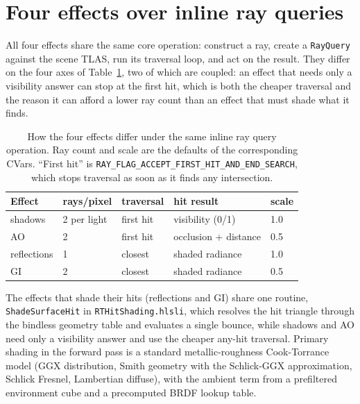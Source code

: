 \section{Four effects over inline ray queries}
\label{sec:efekti}

All four effects share the same core operation: construct a ray, create a \texttt{RayQuery} against
the scene TLAS, run its traversal loop, and act on the result. They differ on the four axes of
Table~\ref{tab:effect-params}, two of which are coupled: an effect that needs only a visibility answer
can stop at the first hit, which is both the cheaper traversal and the reason it can afford a lower
ray count than an effect that must shade what it finds.

\begin{table}[tbp]
\caption[Parameters of the four effects]{How the four effects differ under the same inline ray query
operation. Ray count and scale are the defaults of the corresponding CVars. ``First hit'' is
\texttt{RAY\_FLAG\_ACCEPT\_FIRST\_HIT\_AND\_END\_SEARCH}, which stops traversal as soon as it finds
any intersection.}
\label{tab:effect-params}
\centering
\begin{tabular}{lllll}
\toprule
Effect & rays/pixel & traversal & hit result & scale \\
\midrule
shadows      & 2 per light & first hit & visibility (0/1)  & 1.0 \\
AO           & 2           & first hit & occlusion + distance & 0.5 \\
reflections  & 1           & closest   & shaded radiance   & 1.0 \\
GI           & 2           & closest   & shaded radiance   & 0.5 \\
\bottomrule
\end{tabular}
\end{table}

The effects that shade their hits (reflections and GI) share one routine, \texttt{ShadeSurfaceHit} in
\texttt{RTHitShading.hlsli}, which resolves the hit triangle through the bindless geometry table and
evaluates a single bounce, while shadows and AO need only a visibility answer and use the cheaper
any-hit traversal. Primary shading in the forward pass is a standard metallic-roughness Cook-Torrance model
(GGX distribution, Smith geometry with the Schlick-GGX approximation, Schlick Fresnel, Lambertian
diffuse), with the ambient term from a prefiltered environment cube and a precomputed BRDF lookup
table.

